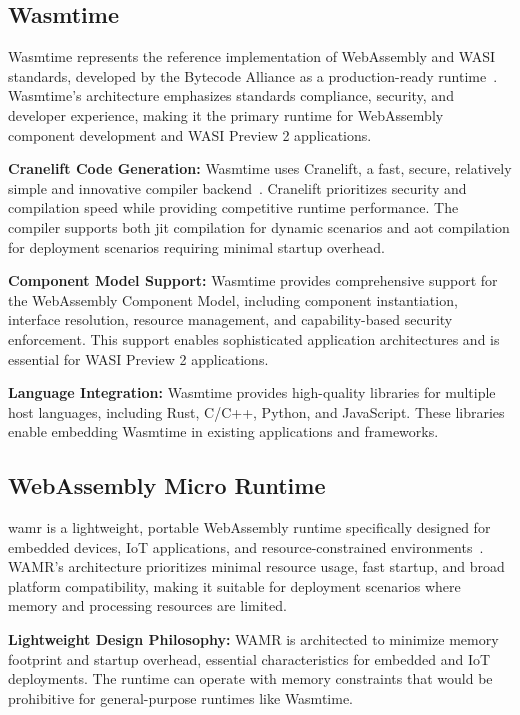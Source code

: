 \subsection{Wasmtime}
\label{subsec:wasmtime}

Wasmtime represents the reference implementation of WebAssembly and WASI standards, developed by the Bytecode Alliance as a production-ready runtime~\cite{wasmtime_project}. Wasmtime's architecture emphasizes standards compliance, security, and developer experience, making it the primary runtime for WebAssembly component development and WASI Preview 2 applications.

\textbf{Cranelift Code Generation:} Wasmtime uses Cranelift, a fast, secure, relatively simple and innovative compiler backend~\cite{cranelift}. Cranelift prioritizes security and compilation speed while providing competitive runtime performance. The compiler supports both \acrshort{jit} compilation for dynamic scenarios and \acrshort{aot} compilation for deployment scenarios requiring minimal startup overhead.

\textbf{Component Model Support:} Wasmtime provides comprehensive support for the WebAssembly Component Model, including component instantiation, interface resolution, resource management, and capability-based security enforcement. This support enables sophisticated application architectures and is essential for WASI Preview 2 applications.

\textbf{Language Integration:} Wasmtime provides high-quality libraries for multiple host languages, including Rust, C/C++, Python, and JavaScript. These libraries enable embedding Wasmtime in existing applications and frameworks.

\subsection{WebAssembly Micro Runtime}
\label{subsec:wamr}

\acrfull{wamr} is a lightweight, portable WebAssembly runtime specifically designed for embedded devices, IoT applications, and resource-constrained environments\cite{wamr_project}~\cite{wamr_project2}. WAMR's architecture prioritizes minimal resource usage, fast startup, and broad platform compatibility, making it suitable for deployment scenarios where memory and processing resources are limited.

\textbf{Lightweight Design Philosophy:} WAMR is architected to minimize memory footprint and startup overhead, essential characteristics for embedded and IoT deployments. The runtime can operate with memory constraints that would be prohibitive for general-purpose runtimes like Wasmtime.

